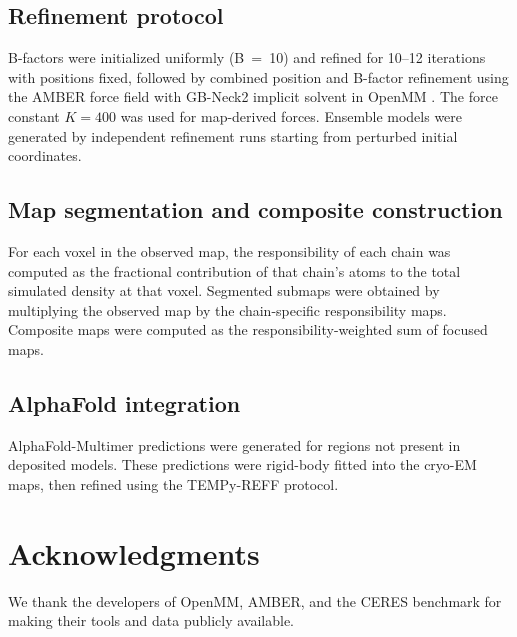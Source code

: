 \documentclass[11pt,a4paper]{article}
\begin{document}
\subsection{Refinement protocol}
B-factors were initialized uniformly (B~=~10) and refined for 10--12 iterations with positions fixed, followed by combined position and B-factor refinement using the AMBER force field with GB-Neck2 implicit solvent in OpenMM \citep{Case2014, Eastman2017}. The force constant $K = 400$ was used for map-derived forces. Ensemble models were generated by independent refinement runs starting from perturbed initial coordinates.

\subsection{Map segmentation and composite construction}
For each voxel in the observed map, the responsibility of each chain was computed as the fractional contribution of that chain's atoms to the total simulated density at that voxel. Segmented submaps were obtained by multiplying the observed map by the chain-specific responsibility maps. Composite maps were computed as the responsibility-weighted sum of focused maps.

\subsection{AlphaFold integration}
AlphaFold-Multimer \citep{Jumper2021, Evans2022} predictions were generated for regions not present in deposited models. These predictions were rigid-body fitted into the cryo-EM maps, then refined using the TEMPy-REFF protocol.

\section*{Acknowledgments}
We thank the developers of OpenMM, AMBER, and the CERES benchmark for making their tools and data publicly available.


\end{document}
